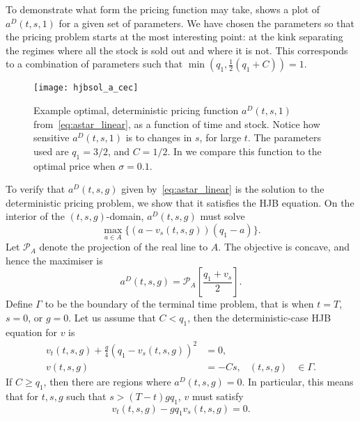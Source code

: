 \documentclass[main.tex]{subfiles}
\begin{document}
\begin{example}\label{ex:acecplot}
  To demonstrate what form the pricing function may take,
   shows a plot of $a^D(t,s,1)$ for a given set of
  parameters. We have chosen the parameters so that the pricing
  problem starts at the most interesting point: at the kink separating
  the regimes where all the stock is sold out and where it is not.
  This corresponds to a combination of parameters such that
  $\min(q_1,\frac{1}{2}(q_1+C))=1$.

  \begin{figure}[htbp]
    \centering
    \texttt{[image: hjbsol\_a\_cec]}
    \caption*{$a^D(t,s,1)$}
    \caption[Example optimal, deterministic pricing function]{Example optimal, deterministic pricing function $a^D(t,s,1)$
      from~\eqref{eq:astar_linear}, as a function of time and stock.
      Notice how sensitive $a^D(t,s,1)$ is to changes in $s$, for large
      $t$.
      The parameters used are $q_1=3/2$, and $C=1/2$.
      In  we compare this function to the optimal price
      when $\sigma=0.1$.
    }\label{fig:hjbsol_a_cec}
  \end{figure}
\end{example}

To verify that $a^D(t,s,g)$ given by~\eqref{eq:astar_linear} is
the solution to the deterministic
pricing problem, we show that it satisfies the HJB equation.
On the interior of the $(t,s,g)$-domain, $a^D(t,s,g)$ must solve
\begin{equation}
  \max_{a\in A} \{(a-v_s(t,s,g))(q_1-a)\}.
\end{equation}
Let $\mathcal{P}_A$ denote the projection of the real line to $A$. The
objective is concave, and hence the maximiser is
\begin{equation}\label{eq:astar_hjb_linear}
  a^D(t,s,g) = \mathcal{P}_A\left[\frac{q_1+v_s}{2}\right].
\end{equation}
Define $\Gamma$ to be the boundary of the terminal time problem,
that is when $t=T$, $s=0$, or $g=0$.
Let us assume that $C< q_1$, then the
deterministic-case HJB equation for $v$ is
\begin{align}\label{eq:hjb_linear}
  v_t(t,s,g)+
  \frac{g}{4}{( q_1-v_s(t,s,g))}^2
  &=0, \\%
  v(t,s,g) &= -Cs,&(t,s,g)&\in \Gamma.
\end{align}
If $C\geq q_1$, then there are regions where $a^D(t,s,g)=0$. In
particular, this means that for $t,s,g$ such that
$s>(T-t)gq_1$, $v$ must satisfy
\begin{equation}\label{eq:hjb_linear_Clarge}
  v_t(t,s,g) - gq_1v_s(t,s,g)=0.
\end{equation}
\end{document}
